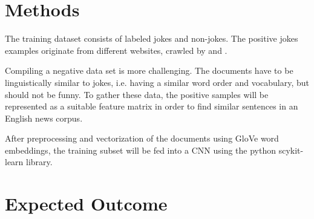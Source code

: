 \documentclass[12pt]{scrartcl}
\begin{document}
\section{Methods}
The training dataset consists of labeled jokes and non-jokes. The positive jokes examples originate from different websites, crawled by \cite{pungasDatasetEnglishPlaintext2017} and \cite{moudgilPythonScriptsBuilding2017}. 

Compiling a negative data set is more challenging. The documents have to be linguistically similar to jokes, i.e. having a similar word order and vocabulary, but should not be funny. To gather these data, the positive samples will be represented as a suitable feature matrix in order to find similar sentences in an English news corpus. 
 
After preprocessing and vectorization of the documents using GloVe word embeddings, the training subset will be fed into a CNN using the python scykit-learn library. 



\section{Expected Outcome}




\end{document}
